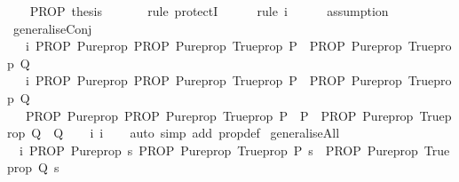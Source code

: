 \begin{isabellebody}
\ \ \isamarkupfalse%
\ {\isachardoublequoteopen}PROP\ {\isacharquery}thesis{\isachardoublequoteclose}\ \isanewline
\ \ \ \ \isamarkupfalse%
\ {\isacharparenleft}rule\ protectI{\isacharparenright}\isanewline
\ \ \ \ \isamarkupfalse%
\ {\isacharparenleft}rule\ i{\isacharprime}{\isacharparenright}\isanewline
\ \ \ \ \isamarkupfalse%
\ assumption\isanewline
\ \ \ \ \isamarkupfalse%
\isanewline
{}\isamarkupfalse%
%
\endisatagproof
{\isafoldproof}%
%
\isadelimproof
\isanewline
%
\endisadelimproof
\isanewline
\isanewline
{}\isamarkupfalse%
\ generaliseConj{\isacharcolon}\ \isanewline
\ \ \ i{}{\isacharcolon}\ {\isachardoublequoteopen}PROP\ Pure{\isachardot}prop\ {\isacharparenleft}PROP\ Pure{\isachardot}prop\ {\isacharparenleft}Trueprop\ P{\isacharparenright}\ {\isasymLongrightarrow}\ PROP\ Pure{\isachardot}prop\ {\isacharparenleft}Trueprop\ Q{\isacharparenright}{\isacharparenright}{\isachardoublequoteclose}\isanewline
\ \ \ i{}{\isacharcolon}\ {\isachardoublequoteopen}PROP\ Pure{\isachardot}prop\ {\isacharparenleft}PROP\ Pure{\isachardot}prop\ {\isacharparenleft}Trueprop\ P{\isacharprime}{\isacharparenright}\ {\isasymLongrightarrow}\ PROP\ Pure{\isachardot}prop\ {\isacharparenleft}Trueprop\ Q{\isacharprime}{\isacharparenright}{\isacharparenright}{\isachardoublequoteclose}\isanewline
\ \ \ {\isachardoublequoteopen}PROP\ Pure{\isachardot}prop\ {\isacharparenleft}PROP\ Pure{\isachardot}prop\ {\isacharparenleft}Trueprop\ {\isacharparenleft}P\ {\isasymand}\ P{\isacharprime}{\isacharparenright}{\isacharparenright}\ {\isasymLongrightarrow}\ {\isacharparenleft}PROP\ Pure{\isachardot}prop\ {\isacharparenleft}Trueprop\ {\isacharparenleft}Q\ {\isasymand}\ Q{\isacharprime}{\isacharparenright}{\isacharparenright}{\isacharparenright}{\isacharparenright}{\isachardoublequoteclose}\isanewline
%
\isadelimproof
\ \ %
\endisadelimproof
%
\isatagproof
{}\isamarkupfalse%
\ i{}\ i{}\isanewline
\ \ \isamarkupfalse%
\ {\isacharparenleft}auto\ simp\ add{\isacharcolon}\ prop{\isacharunderscore}def{\isacharparenright}%
\endisatagproof
{\isafoldproof}%
%
\isadelimproof
\isanewline
%
\endisadelimproof
\isanewline
{}\isamarkupfalse%
\ generaliseAll{\isacharcolon}\ \isanewline
\ \ i{\isacharcolon}\ {\isachardoublequoteopen}PROP\ Pure{\isachardot}prop\ {\isacharparenleft}{\isasymAnd}s{\isachardot}\ PROP\ Pure{\isachardot}prop\ {\isacharparenleft}Trueprop\ {\isacharparenleft}P\ s{\isacharparenright}{\isacharparenright}\ {\isasymLongrightarrow}\ PROP\ Pure{\isachardot}prop\ {\isacharparenleft}Trueprop\ {\isacharparenleft}Q\ s{\isacharparenright}{\isacharparenright}{\isacharparenright}{\isachardoublequoteclose}\ \isanewline

\end{isabellebody}
